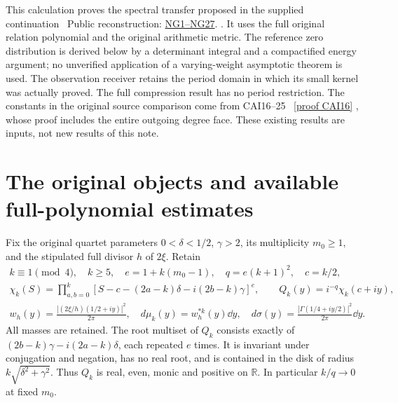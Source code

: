 \documentclass[11pt]{article}
\newcommand{\R}{\mathbb R}\newcommand{\C}{\mathbb C}
\begin{document}
This calculation proves the spectral transfer proposed in the supplied
continuation \cite{NGincoming}%
~Public reconstruction: \href{https://github.com/KokunoYumeto/zeta-function-research-reader/blob/689a8f87e9c12b7a99b01b3123438c6751ee608f/workbenches/splitzero-tandem/continuations/20260920-gaussian-arithmetic-return/GAUSSIAN_ARITHMETIC_RETURN.tex\#L31}{NG1--NG27}.%
{}. It uses the full original relation polynomial
and the original arithmetic metric. The reference zero distribution is
derived below by a determinant integral and a compactified energy argument;
no unverified application of a varying-weight asymptotic theorem is used.
The observation receiver retains the period domain in which its small
kernel was actually proved. The full compression result has no period
restriction. The constants in the original source comparison come from
CAI16--25 \cite{cumulative}%
~\href{https://github.com/KokunoYumeto/zeta-function-research-reader/blob/5992ad50c0f2a06921f1fcaded7b4e38097c0739/workbenches/splitzero-tandem/continuations/20260920-original-kernel-mixed-determinants/cumulative/09_UPDATED_JOINT_NOTE.tex\#L63199}{[proof CAI16]}%
{}, whose proof includes the entire outgoing degree
face. These existing results are inputs, not new results of this note.

\section{The original objects and available full-polynomial estimates}
Fix the original quartet parameters $0<\delta<1/2$, $\gamma>2$, its
multiplicity $m_0\ge1$, and the stipulated full divisor $h$ of $2\xi$.
Retain
\begin{equation}\tag{NG1}
 \begin{gathered}
 k\equiv1\pmod4,\quad k\ge5,\quad e=1+k(m_0-1),\quad q=e(k+1)^2,\quad c=k/2,\\
 \chi_k(S)=\prod_{a,b=0}^k
 [S-c-(2a-k)\delta-i(2b-k)\gamma]^e,\qquad
 Q_k(y)=i^{-q}\chi_k(c+iy),\\
 w_h(y)=\frac{|(2\xi/h)(1/2+iy)|^2}{2\pi},\quad
 d\mu_k(y)=w_h^{*k}(y)\dd y,\quad
 d\sigma(y)=\frac{|\Gamma(1/4+iy/2)|^2}{2\pi}\dd y.
 \end{gathered}
\end{equation}
All masses are retained. The root multiset of $Q_k$ consists exactly of
$(2b-k)\gamma-i(2a-k)\delta$, each repeated $e$ times. It is invariant
under conjugation and negation, has no real root, and is contained in the
disk of radius $k\sqrt{\delta^2+\gamma^2}$. Thus $Q_k$ is real, even,
monic and positive on $\R$. In particular $k/q\to0$ at fixed $m_0$.
\end{document}

